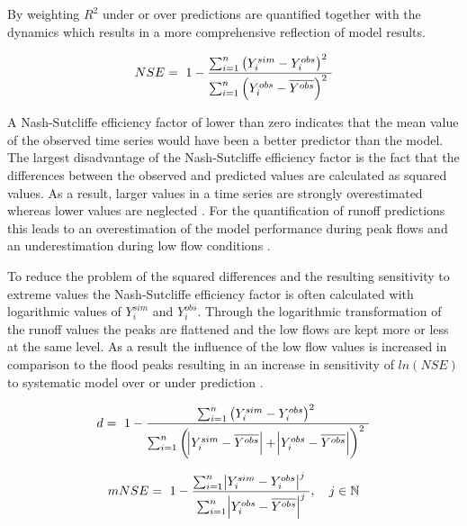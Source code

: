 By weighting $R^2$ under or over predictions are quantified together with the dynamics which results in a more comprehensive reflection of model results.

\begin{equation} 
	\label{eq:nse}
	NSE =\ 1-\frac{\sum^n_{i=1}{{\left(Y^{sim}_i-Y^{obs}_i\right)}^2\ }}{\sum^n_{i=1}{{\left(Y^{obs}_i-\overline{Y^{obs}}\right)}^2\ }} \\
\end{equation}

A Nash-Sutcliffe efficiency factor of lower than zero indicates that the mean value of the observed time series would have been a better predictor than the model. The largest disadvantage of the Nash-Sutcliffe efficiency factor is the fact that the differences between the observed and predicted values are calculated as squared values. As a result, larger values in a time series are strongly overestimated whereas lower values are neglected \cite{legates1999evaluating}. For the quantification of runoff predictions this leads to an overestimation of the model performance during peak flows and an underestimation during low flow conditions \cite{krause2005comparison}.

To reduce the problem of the squared differences and the resulting sensitivity to extreme values the Nash-Sutcliffe efficiency factor is often calculated with logarithmic values of $Y^{sim}_i$ and $Y^{obs}_i$. Through the logarithmic transformation of the runoff values the peaks are flattened and the low flows are kept more or less at the same level. As a result the influence of the low flow values is increased in comparison to the flood peaks resulting in an increase in sensitivity of $ln(NSE)$ to systematic model over or under prediction \cite{krause2005comparison}.

\begin{equation} 
	\label{eq:d}
	d =\ 1-\frac{\sum^n_{i=1}{\left(Y^{sim}_i-Y^{obs}_i\right)}^2\ }{\sum^n_{i=1}{\left(\abs{Y^{sim}_i-\overline{Y^{obs}}}+\abs{Y^{obs}_i-\overline{Y^{obs}}}\right)}^2\ } \\
\end{equation}

\begin{equation} 
	\label{eq:mnse}
	mNSE =\ 1-\frac{\sum^n_{i=1}{{\abs{Y^{sim}_i-Y^{obs}_i}}^j\ }}{\sum^n_{i=1}{\abs{Y^{obs}_i-\overline{Y^{obs}}}}^j}, \quad j \in \mathbb{N} \\
\end{equation}

